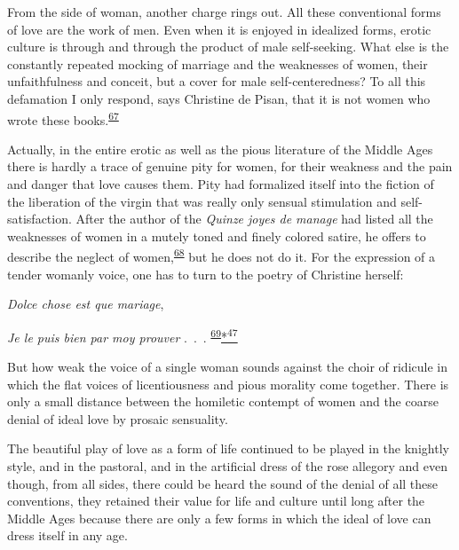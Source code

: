 From the side of woman, another charge rings out. All these conventional
forms of love are the work of men. Even when it is enjoyed in idealized
forms, erotic culture is through and through the product of male
self-seeking. What else is the constantly repeated mocking of marriage
and the weaknesses of women, their unfaithfulness and conceit, but a
cover for male self-centeredness? To all this defamation I only respond,
says Christine de Pisan, that it is not women who wrote these
books.\textsuperscript{\protect\hypertarget{11_Chapter_Four__THE_FORMS_OF_LOVE.xhtmlux5cux23id_1355}{\protect\hyperlink{23_NOTES.xhtmlux5cux23id_1356}{67}}}

Actually, in the entire erotic as well as the pious literature of the
Middle Ages there is hardly a trace of genuine pity for women, for their
weakness and the pain and danger that love causes them. Pity had
formalized itself into the fiction of the liberation of the virgin that
was really only sensual stimulation and self-satisfaction. After the
author of the \emph{Quinze joyes de manage} had listed all the
weaknesses of women in a mutely toned and finely colored satire, he
offers to describe the neglect of
women,\textsuperscript{\protect\hypertarget{11_Chapter_Four__THE_FORMS_OF_LOVE.xhtmlux5cux23id_1353}{\protect\hyperlink{23_NOTES.xhtmlux5cux23id_1354}{68}}}
but he does not do it. For the expression of a tender womanly voice, one
has to turn to the poetry of Christine herself:

\emph{Dolce chose est que mariage},

\emph{Je le puis bien par moy prouver} .~.~.
\textsuperscript{\protect\hypertarget{11_Chapter_Four__THE_FORMS_OF_LOVE.xhtmlux5cux23id_1351}{\protect\hyperlink{23_NOTES.xhtmlux5cux23id_1352}{69}}}\protect\hypertarget{11_Chapter_Four__THE_FORMS_OF_LOVE.xhtmlux5cux23id_2949}{\protect\hyperlink{23_NOTES.xhtmlux5cux23id_2950}{*\textsuperscript{47}}}

But how weak the voice of a single woman sounds against the choir of
ridicule in which the flat voices of licentiousness and pious morality
come together. There is only a small distance between the homiletic
contempt of women and the coarse denial of ideal love by prosaic
sensuality.

The beautiful play of love as a form of life continued to be played in
the knightly style, and in the pastoral, and in the artificial dress of
the rose allegory and even though, from all sides, there could be heard
the sound of the denial of all these conventions, they retained their
value for life and culture until long after the Middle Ages because
there are only a few forms in which the ideal of love can dress itself
in any age.
